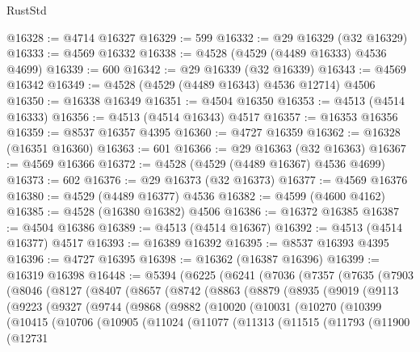 \begin{lexlean}{RustStd}
\begin{coremodule}
@16328 := @4714 @16327
@16329 := 599
@16332 := @29 @16329 (@32 @16329)
@16333 := @4569 @16332
@16338 := @4528 (@4529 (@4489 @16333) @4536 @4699)
@16339 := 600
@16342 := @29 @16339 (@32 @16339)
@16343 := @4569 @16342
@16349 := @4528 (@4529 (@4489 @16343) @4536 @12714) @4506
@16350 := @16338 @16349
@16351 := @4504 @16350
@16353 := @4513 (@4514 @16333)
@16356 := @4513 (@4514 @16343) @4517
@16357 := @16353 @16356
@16359 := @8537 @16357 @4395
@16360 := @4727 @16359
@16362 := @16328 (@16351 @16360)
@16363 := 601
@16366 := @29 @16363 (@32 @16363)
@16367 := @4569 @16366
@16372 := @4528 (@4529 (@4489 @16367) @4536 @4699)
@16373 := 602
@16376 := @29 @16373 (@32 @16373)
@16377 := @4569 @16376
@16380 := @4529 (@4489 @16377) @4536
@16382 := @4599 (@4600 @4162)
@16385 := @4528 (@16380 @16382) @4506
@16386 := @16372 @16385
@16387 := @4504 @16386
@16389 := @4513 (@4514 @16367)
@16392 := @4513 (@4514 @16377) @4517
@16393 := @16389 @16392
@16395 := @8537 @16393 @4395
@16396 := @4727 @16395
@16398 := @16362 (@16387 @16396)
@16399 := @16319 @16398
@16448 := @5394
    (@6225
      (@6241
        (@7036
          (@7357
            (@7635
              (@7903
                (@8046
                  (@8127
                    (@8407
                      (@8657
                        (@8742
                          (@8863
                            (@8879
                              (@8935
                                (@9019
                                  (@9113
                                    (@9223
                                      (@9327
                                        (@9744
                                          (@9868
                                            (@9882
                                              (@10020
                                                (@10031
                                                  (@10270
                                                    (@10399
                                                      (@10415
                                                        (@10706
                                                          (@10905
                                                            (@11024
                                                              (@11077
                                                                (@11313
                                                                  (@11515
                                                                    (@11793
                                                                      (@11900
                                                                        (@12731

\end{coremodule}
\end{lexlean}
